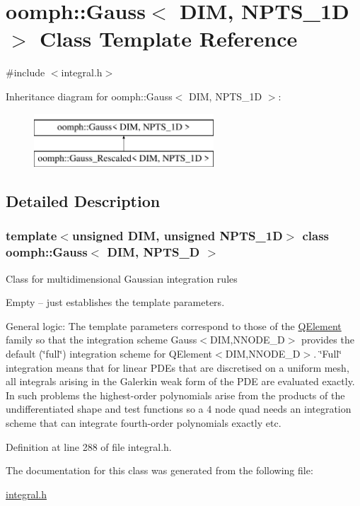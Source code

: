\hypertarget{classoomph_1_1Gauss}{}\section{oomph\+:\+:Gauss$<$ D\+IM, N\+P\+T\+S\+\_\+1D $>$ Class Template Reference}
\label{classoomph_1_1Gauss}


{\ttfamily \#include $<$integral.\+h$>$}

Inheritance diagram for oomph\+:\+:Gauss$<$ D\+IM, N\+P\+T\+S\+\_\+1D $>$\+:\begin{figure}[H]
\begin{center}
\leavevmode
\includegraphics[height=2.000000cm]{classoomph_1_1Gauss}
\end{center}
\end{figure}


\subsection{Detailed Description}
\subsubsection*{template$<$unsigned D\+IM, unsigned N\+P\+T\+S\+\_\+1D$>$\newline
class oomph\+::\+Gauss$<$ D\+I\+M, N\+P\+T\+S\+\_\+D $>$}

Class for multidimensional Gaussian integration rules

Empty -- just establishes the template parameters.

General logic\+: The template parameters correspond to those of the \hyperlink{classoomph_1_1QElement}{Q\+Element} family so that the integration scheme Gauss$<$\+D\+I\+M,\+N\+N\+O\+D\+E\+\_\+D$>$ provides the default (\char`\"{}full\char`\"{}) integration scheme for Q\+Element$<$\+D\+I\+M,\+N\+N\+O\+D\+E\+\_\+D$>$. \char`\"{}\+Full\char`\"{} integration means that for linear P\+D\+Es that are discretised on a uniform mesh, all integrals arising in the Galerkin weak form of the P\+DE are evaluated exactly. In such problems the highest-\/order polynomials arise from the products of the undifferentiated shape and test functions so a 4 node quad needs an integration scheme that can integrate fourth-\/order polynomials exactly etc. 

Definition at line 288 of file integral.\+h.



The documentation for this class was generated from the following file\+:\begin{DoxyCompactItemize}
\item 
\hyperlink{integral_8h}{integral.\+h}\end{DoxyCompactItemize}
